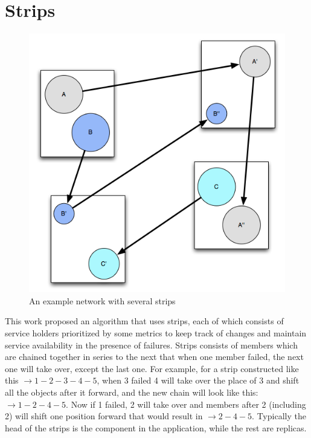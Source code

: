 \section{Strips} %
\label{s:ss}

\begin{figure}[h!]
\caption{An example network with several strips}
\label{fig:strips-network}
\centering
    \includegraphics[width=\linewidth]{figures/strips-network}
\end{figure}


This work proposed an algorithm that uses strips, each of which consists of
service holders prioritized by some metrics to keep track of changes and
maintain service availability in the presence of failures. Strips consists of
members which are chained together in series to the next that when one member
failed, the next one will take over, except the last one. For example, for
a strip constructed like this $\rightarrow 1-2-3-4-5$, when 3 failed 4 will
take over the place of 3 and shift all the objects after it forward, and the
new chain will look like this: $\rightarrow 1-2-4-5$. Now if 1 failed, 2 will
take over and members after 2 (including 2) will shift one position forward
that would result in $\rightarrow 2-4-5$. Typically the head of the strips is
the component in the application, while the rest are replicas.

